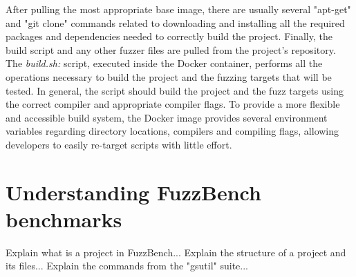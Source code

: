\newline
After pulling the most appropriate base image, there are usually several "apt-get" and "git clone" commands related to downloading and installing all the required packages and dependencies needed to correctly build the project.
\newline
Finally, the build script and any other fuzzer files are pulled from the project's repository.
\newline \newline
The \textit{build.sh:} script, executed inside the Docker container, performs all the operations necessary to build the project and the fuzzing targets that will be tested.
\newline
In general, the script should build the project and the fuzz targets using the correct compiler and appropriate compiler flags.
\newline
To provide a more flexible and accessible build system, the Docker image provides several environment variables regarding directory locations, compilers and compiling flags, allowing developers to easily re-target scripts with little effort.




\newpage
\section{Understanding FuzzBench benchmarks}
Explain what is a project in FuzzBench...
\newline \newline
Explain the structure of a project and its files...
\newline \newline
Explain the commands from the "gsutil" suite...




\newpage
